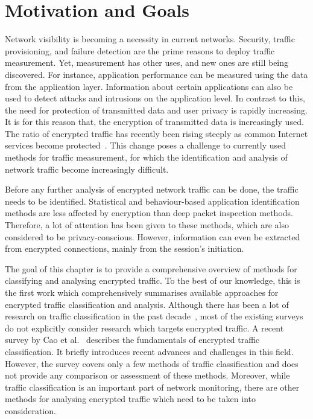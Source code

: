 \begin{chapintro}
\end{chapintro}

\newpage

\section{Motivation and Goals}\label{sec:enc-motivation}

Network visibility is becoming a necessity in current networks. Security, traffic provisioning, and failure detection are the prime reasons to deploy traffic measurement. Yet, measurement has other uses, and new ones are still being discovered. For instance, application performance can be measured using the data from the application layer. Information about certain applications can also be used to detect attacks and intrusions on the application level. In contrast to this, the need for protection of transmitted data and user privacy is rapidly increasing. It is for this reason that, the encryption of transmitted data is increasingly used. The ratio of encrypted traffic has recently been rising steeply as common Internet services become protected~\cite{Sandvine-2014-Global}. This change poses a challenge to currently used methods for traffic measurement, for which the identification and analysis of network traffic become increasingly difficult.

Before any further analysis of encrypted network traffic can be done, the traffic needs to be identified. Statistical and behaviour-based application identification methods are less affected by encryption than deep packet inspection methods. Therefore, a lot of attention has been given to these methods, which are also considered to be privacy-conscious. However, information can even be extracted from encrypted connections, mainly from the session's initiation.

The goal of this chapter is to provide a comprehensive overview of methods for classifying and analysing encrypted traffic. To the best of our knowledge, this is the first work which comprehensively summarises available approaches for encrypted traffic classification and analysis. Although there has been a lot of research on traffic classification in the past decade~\cite{Dainotti-2012-Issues, Nguyen-2008-Survey, Zhang-2009-State, Callado-2009-Survey, Finsterbusch-2014-Survey}, most of the existing surveys do not explicitly consider research which targets encrypted traffic. A recent survey by Cao et al.~\cite{Cao-2014-Survey} describes the fundamentals of encrypted traffic classification. It briefly introduces recent advances and challenges in this field. However, the survey covers only a few methods of traffic classification and does not provide any comparison or assessment of these methods. Moreover, while traffic classification is an important part of network monitoring, there are other methods for analysing encrypted traffic which need to be taken into consideration. 

